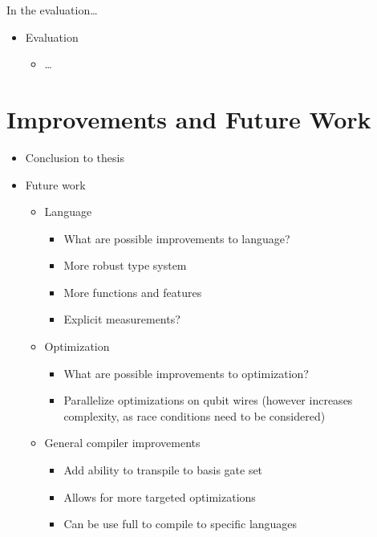 In the evaluation\dots
\begin{itemize}
    \item Evaluation
    \begin{itemize}
        \item \dots
    \end{itemize} 
\end{itemize}

\section{Improvements and Future Work}
\begin{itemize}
    \item Conclusion to thesis
    \item Future work
    \begin{itemize}
        \item Language
        \begin{itemize}
            \item What are possible improvements to language?
            \item More robust type system
            \item More functions and features
            \item Explicit measurements?
        \end{itemize}
        \item Optimization
        \begin{itemize}
            \item What are possible improvements to optimization?
            \item Parallelize optimizations on qubit wires (however increases complexity, as race conditions need to be considered)
        \end{itemize}
        \item General compiler improvements
        \begin{itemize}
            \item Add ability to transpile to basis gate set
            \item Allows for more targeted optimizations
            \item Can be use full to compile to specific languages
        \end{itemize}
    \end{itemize}

\end{itemize}